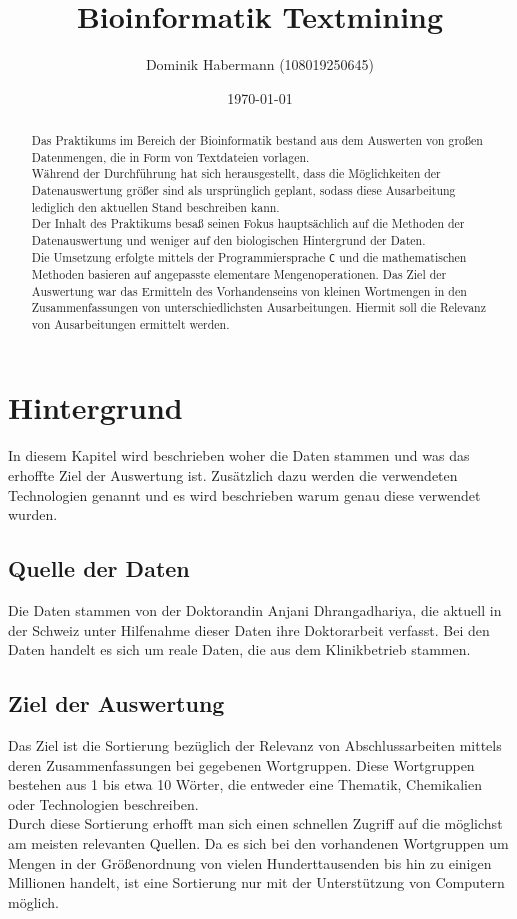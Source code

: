 \documentclass[a4paper,10pt]{article}
\title{Bioinformatik Textmining}
\author{Dominik Habermann (108019250645)}
\date{\today}
\newcommand{\dataSource}[0]{Anjani Dhrangadhariya}
\begin{document}
\maketitle

\begin{abstract}
    Das Praktikums im Bereich der Bioinformatik bestand aus dem Auswerten von großen Datenmengen, die in Form von Textdateien vorlagen.\\
    Während der Durchführung hat sich herausgestellt, dass die Möglichkeiten der Datenauswertung größer sind als ursprünglich geplant, sodass diese Ausarbeitung lediglich den aktuellen Stand beschreiben kann.\\
    Der Inhalt des Praktikums besaß seinen Fokus hauptsächlich auf die Methoden der Datenauswertung und weniger auf den biologischen Hintergrund der Daten.\\

    Die Umsetzung erfolgte mittels der Programmiersprache \texttt{C} und die mathematischen Methoden basieren auf angepasste elementare Mengenoperationen. Das Ziel der Auswertung war das Ermitteln des Vorhandenseins von kleinen Wortmengen in den Zusammenfassungen von unterschiedlichsten Ausarbeitungen. Hiermit soll die Relevanz von Ausarbeitungen ermittelt werden.
\end{abstract}

\section{Hintergrund}
    In diesem Kapitel wird beschrieben woher die Daten stammen und was das erhoffte Ziel der Auswertung ist. Zusätzlich dazu werden die verwendeten Technologien genannt und es wird beschrieben warum genau diese verwendet wurden.

    \subsection{Quelle der Daten}
        Die Daten stammen von der Doktorandin \dataSource, die aktuell in der Schweiz unter Hilfenahme dieser Daten ihre Doktorarbeit verfasst. Bei den Daten handelt es sich um reale Daten, die aus dem Klinikbetrieb stammen.

    \subsection{Ziel der Auswertung}
        Das Ziel ist die Sortierung bezüglich der Relevanz von Abschlussarbeiten mittels deren Zusammenfassungen bei gegebenen Wortgruppen. Diese Wortgruppen bestehen aus 1 bis etwa 10 Wörter, die entweder eine Thematik, Chemikalien oder Technologien beschreiben.\\
        Durch diese Sortierung erhofft man sich einen schnellen Zugriff auf die möglichst am meisten relevanten Quellen. Da es sich bei den vorhandenen Wortgruppen um Mengen in der Größenordnung von vielen Hunderttausenden bis hin zu einigen Millionen handelt, ist eine Sortierung nur mit der Unterstützung von Computern möglich.
\end{document}

